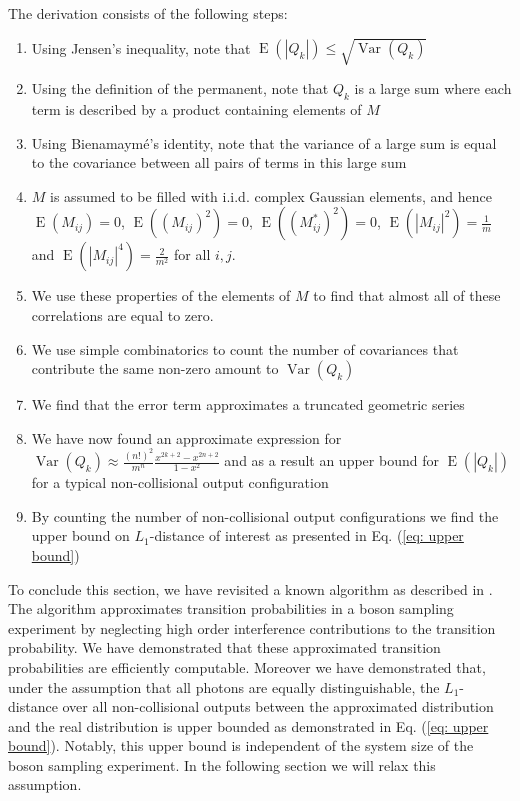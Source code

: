 \documentclass[10pt,aps,pra,twocolumn,superscriptaddress]{revtex4-2}
\DeclareMathOperator{\E}{E}
\DeclareMathOperator{\Var}{Var}
\begin{document}
The derivation consists of the following steps:
\begin{enumerate}
    \item Using Jensen's inequality, note that $\E(|Q_k|)\leq \sqrt{\Var(Q_k)}$
    \item Using the definition of the permanent, note that $Q_k$ is a large sum where each term is described by a product containing elements of $M$
    \item Using Bienamaymé's identity, note that the variance of a large sum is equal to the covariance between all pairs of terms in this large sum
    \item $M$ is assumed to be filled with i.i.d. complex Gaussian elements, and hence $\E(M_{ij})=0$, $\E((M_{ij})^2)=0$, $\E((M^{*}_{ij})^2)=0$, $\E(|M_{ij}|^2)=\frac{1}{m}$ and $\E(|M_{ij}|^4)=\frac{2}{m^2}$ for all $i,j$.
    \item We use these properties of the elements of $M$ to find that almost all of these correlations are equal to zero.
    \item We use simple combinatorics to count the number of covariances that contribute the same non-zero amount to $\Var(Q_k)$
    \item We find that the error term approximates a truncated geometric series
    \item We have now found an approximate expression for $\Var(Q_k)\approx \frac{(n!)^2}{m^n}\frac{x^{2k+2}-x^{2n+2}}{1-x^2}$ and as a result an upper bound for $\E(|Q_k|)$ for a typical non-collisional output configuration
    \item By counting the number of non-collisional output configurations we find the upper bound on $L_1$-distance of interest as presented in Eq. (\ref{eq: upper bound})
\end{enumerate}
To conclude this section, we have revisited a known algorithm as described in \cite{renema2018efficient, GarciaPatron2019simulatingboson}. The algorithm approximates transition probabilities in a boson sampling experiment by neglecting high order interference contributions to the transition probability. We have demonstrated that these approximated transition probabilities are efficiently computable. Moreover we have demonstrated that, under the assumption that all photons are equally distinguishable, the $L_1$-distance over all non-collisional outputs between the approximated distribution and the real distribution is upper bounded as demonstrated in Eq. (\ref{eq: upper bound}). Notably, this upper bound is independent of the system size of the boson sampling experiment. In the following section we will relax this assumption.
\end{document}
